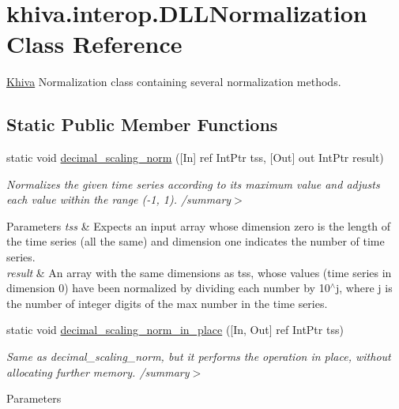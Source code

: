 \hypertarget{classkhiva_1_1interop_1_1_d_l_l_normalization}{}\section{khiva.\+interop.\+D\+L\+L\+Normalization Class Reference}
\label{classkhiva_1_1interop_1_1_d_l_l_normalization}


\mbox{\hyperlink{classkhiva_1_1_khiva}{Khiva}} Normalization class containing several normalization methods.  


\subsection*{Static Public Member Functions}
\begin{DoxyCompactItemize}
\item 
static void \mbox{\hyperlink{classkhiva_1_1interop_1_1_d_l_l_normalization_a4b8a8b57779a2e2a9681873ed38d1ead}{decimal\+\_\+scaling\+\_\+norm}} (\mbox{[}In\mbox{]} ref Int\+Ptr tss, \mbox{[}Out\mbox{]} out Int\+Ptr result)
\begin{DoxyCompactList}\small\item\em Normalizes the given time series according to its maximum value and adjusts each value within the range (-\/1, 1). /summary$>$ 
\begin{DoxyParams}{Parameters}
{\em tss} & Expects an input array whose dimension zero is the length of the time series (all the same) and dimension one indicates the number of time series.\\
\hline
{\em result} & An array with the same dimensions as tss, whose values (time series in dimension 0) have been normalized by dividing each number by 10$^\wedge$j, where j is the number of integer digits of the max number in the time series.\\
\hline
\end{DoxyParams}
\end{DoxyCompactList}\item 
static void \mbox{\hyperlink{classkhiva_1_1interop_1_1_d_l_l_normalization_afef20cc6ada16fe84c8c659677899c74}{decimal\+\_\+scaling\+\_\+norm\+\_\+in\+\_\+place}} (\mbox{[}In, Out\mbox{]} ref Int\+Ptr tss)
\begin{DoxyCompactList}\small\item\em Same as decimal\+\_\+scaling\+\_\+norm, but it performs the operation in place, without allocating further memory. /summary$>$ 
\begin{DoxyParams}{Parameters}

\end{DoxyParams}
\end{DoxyCompactList}
\end{DoxyCompactItemize}

